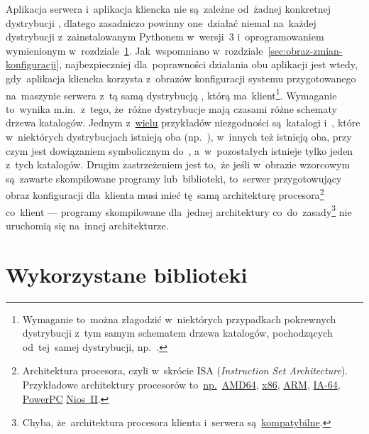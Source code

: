 \documentclass[thesis]{subfiles}
\begin{document}
Aplikacja serwera i~aplikacja kliencka nie są~zależne od~żadnej konkretnej dystrybucji , dlatego zasadniczo powinny one~działać niemal na~każdej dystrybucji z~zainstalowanym Pythonem w~wersji~3 i~oprogramowaniem wymienionym w~rozdziale~\ref{sec:wykorzystane-oprogramowanie}. Jak~wspomniano w~rozdziale~\ref{sec:obraz-zmian-konfiguracji}, najbezpieczniej dla~poprawności działania obu aplikacji jest wtedy, gdy~aplikacja kliencka korzysta z~obrazów konfiguracji systemu przygotowanego na~maszynie serwera z~tą samą dystrybucją , którą ma~klient\footnote{Wymaganie to~można złagodzić w~niektórych przypadkach pokrewnych dystrybucji z~tym samym schematem drzewa katalogów, pochodzących od~tej~samej dystrybucji, np.~\debian{}.}. Wymaganie to~wynika m.in.~z~tego, że~różne dystrybucje mają czasami różne schematy drzewa katalogów. Jednym z~\href{https://en.wikipedia.org/wiki/Filesystem_Hierarchy_Standard#FHS_compliance}{wielu} przykładów niezgodności są~katalogi  i~, które w~niektórych dystrybucjach istnieją oba (np.~\debian{}), w~innych też istnieją oba, przy czym  jest dowiązaniem symbolicznym do~, a~w~pozostałych istnieje tylko jeden z~tych katalogów. Drugim zastrzeżeniem jest to,~że jeśli w~obrazie wzorcowym są~zawarte skompilowane programy lub~biblioteki, to~serwer przygotowujący obraz konfiguracji dla~klienta musi mieć tę~samą architekturę procesora\footnote{Architektura procesora, czyli w~skrócie ISA (\emph{Instruction Set Architecture}). Przykładowe architektury procesorów to~\href{https://en.wikipedia.org/wiki/List_of_instruction_sets}{np.}~\href{https://en.wikipedia.org/wiki/X86-64}{AMD64}, \href{https://en.wikipedia.org/wiki/X86}{x86}, \href{https://en.wikipedia.org/wiki/ARM_architecture}{ARM}, \href{https://en.wikipedia.org/wiki/IA-64}{IA-64}, \href{https://en.wikipedia.org/wiki/PowerPC}{PowerPC} \href{https://en.wikipedia.org/wiki/Nios_II}{Nios~II}.} co~klient --- programy skompilowane dla~jednej architektury co~do~zasady\footnote{Chyba, że~architektura procesora klienta i~serwera są~\href{https://en.wikipedia.org/wiki/X86-64\#OPMODES}{kompatybilne}.} nie uruchomią się na~innej architekturze.


\section{Wykorzystane biblioteki}
\label{sec:wykorzystane-oprogramowanie}
\end{document}
